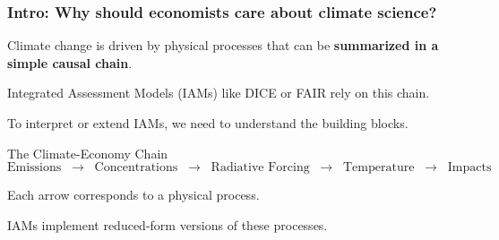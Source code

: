 \documentclass[xcolor=x11names,compress,aspectratio=169]{beamer}%
\makeatletter
\renewenvironment{itemize}{\begin{compactitemize}[<+-| alert@+>]}{\end{compactitemize}}
\makeatother
\begin{document}
\begin{frame}%
%

\frametitle{Intro: Why should economists care about climate science?}%


\begin{itemize}
\item Climate change is driven by physical processes that can be
\textbf{summarized in a simple causal chain}.

\item Integrated Assessment Models (IAMs) like DICE or FAIR rely on this chain.

\item To interpret or extend IAMs, we need to understand the building blocks.
\end{itemize}

\vspace{0.5cm} \begin{block}{The Climate-Economy Chain}
\[
\text{Emissions} \;\;\rightarrow\;\; \text{Concentrations} \;\;\rightarrow\;\;
\text{Radiative Forcing} \;\;\rightarrow\;\; \text{Temperature} \;\;\rightarrow\;\; \text{Impacts}
\]
\end{block}
\vspace{0.3cm}

\begin{itemize}
\item Each arrow corresponds to a physical process.

\item IAMs implement reduced-form versions of these processes.
\end{itemize}

%

\transboxout
\end{frame}%
%
\end{document}
